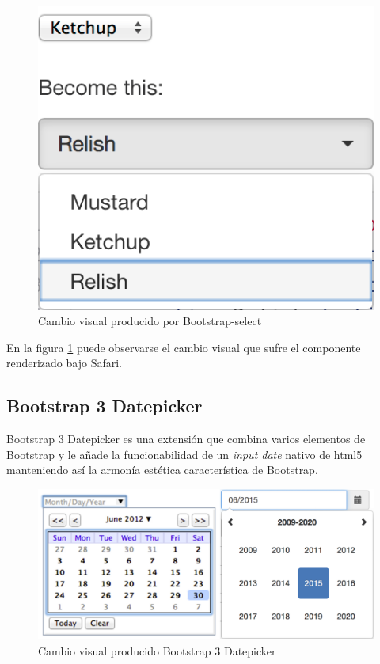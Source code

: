 \begin{figure}[!htbp]
	\centering
	\includegraphics[scale=0.45]{fig/bootstrap_select}
	\caption{Cambio visual producido por Bootstrap-select}
	\label{fig:bootstrap-select}
\end{figure}

\FloatBarrier

En la figura \ref{fig:bootstrap-select} puede observarse el cambio visual que sufre el componente  renderizado bajo Safari\cite{Safari}.

\subsection{Bootstrap 3 Datepicker}

Bootstrap 3 Datepicker\cite{BootstrapDatepicker} es una extensión que combina varios elementos de Bootstrap y le añade la funcionabilidad de un \textit{input date} nativo de \acrshort{html}5 manteniendo así la armonía estética característica de Bootstrap.

\begin{figure}[!htbp]
	\centering
	\includegraphics[scale=0.25]{fig/bootstrap_datepicker}
	\caption{Cambio visual producido Bootstrap 3 Datepicker}
	\label{fig:bootstrap-datepicker}
\end{figure}

